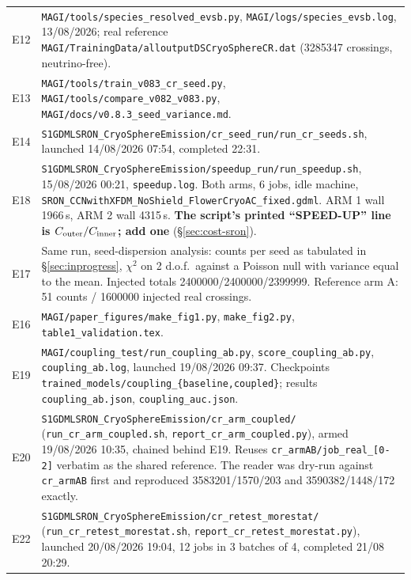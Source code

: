 \documentclass[11pt,a4paper]{article}
\begin{document}
\begin{longtable}{p{1.1cm}>{\raggedright\arraybackslash}p{14.5cm}}
E12& \texttt{MAGI/tools/species\_resolved\_evsb.py},
     \texttt{MAGI/logs/species\_evsb.log}, 13/08/2026; real reference
     \texttt{MAGI/TrainingData/alloutputDSCryoSphereCR.dat}
     (\num{3285347} crossings, neutrino-free). \\
E13& \texttt{MAGI/tools/train\_v083\_cr\_seed.py},
     \texttt{MAGI/tools/compare\_v082\_v083.py},
     \texttt{MAGI/docs/v0.8.3\_seed\_variance.md}. \\
E14& \texttt{S1GDMLSRON\_CryoSphereEmission/cr\_seed\_run/run\_cr\_seeds.sh},
     launched 14/08/2026 07:54, completed 22:31. \\
E18& \texttt{S1GDMLSRON\_CryoSphereEmission/speedup\_run/run\_speedup.sh},
     15/08/2026 00:21, \texttt{speedup.log}. Both arms, 6 jobs, idle machine,
     \texttt{SRON\_CCNwithXFDM\_NoShield\_FlowerCryoAC\_fixed.gdml}. ARM 1 wall
     1966\,s, ARM 2 wall 4315\,s. \textbf{The script's printed ``SPEED-UP''
     line is $C_{\rm outer}/C_{\rm inner}$; add one} (\S\ref{sec:cost-sron}). \\
E17& Same run, seed-dispersion analysis: counts per seed as tabulated in
     \S\ref{sec:inprogress}, $\chi^2$ on 2 d.o.f.\ against a Poisson null with
     variance equal to the mean. Injected totals
     \num{2400000}/\num{2400000}/\num{2399999}. Reference arm A: 51 counts /
     \num{1600000} injected real crossings. \\
E16& \texttt{MAGI/paper\_figures/make\_fig1.py},
     \texttt{make\_fig2.py}, \texttt{table1\_validation.tex}. \\
E19& \texttt{MAGI/coupling\_test/run\_coupling\_ab.py},
     \texttt{score\_coupling\_ab.py}, \texttt{coupling\_ab.log},
     launched 19/08/2026 09:37. Checkpoints
     \texttt{trained\_models/coupling\_\{baseline,coupled\}}; results
     \texttt{coupling\_ab.json}, \texttt{coupling\_auc.json}. \\
E20& \texttt{S1GDMLSRON\_CryoSphereEmission/cr\_arm\_coupled/}
     (\texttt{run\_cr\_arm\_coupled.sh}, \texttt{report\_cr\_arm\_coupled.py}),
     armed 19/08/2026 10:35, chained behind E19. Reuses
     \texttt{cr\_armAB/job\_real\_[0-2]} verbatim as the shared reference. The
     reader was dry-run against \texttt{cr\_armAB} first and reproduced
     \num{3583201}/1570/203 and \num{3590382}/1448/172 exactly. \\
E22& \texttt{S1GDMLSRON\_CryoSphereEmission/cr\_retest\_morestat/}
     (\texttt{run\_cr\_retest\_morestat.sh}, \texttt{report\_cr\_retest\_morestat.py}),
     launched 20/08/2026 19:04, 12 jobs in 3 batches of 4, completed 21/08 20:29.

\end{longtable}
\end{document}
